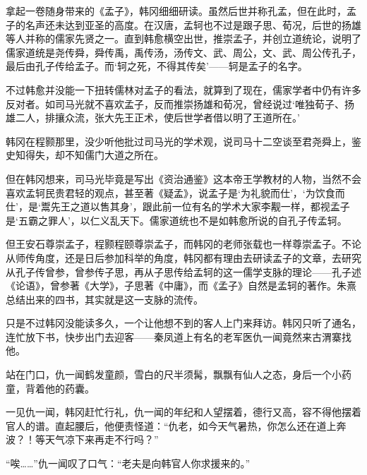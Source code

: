 拿起一卷随身带来的《孟子》，韩冈细细研读。虽然后世并称孔孟，但在此时，孟子的名声还未达到亚圣的高度。在汉唐，孟轲也不过是跟子思、荀况，后世的扬雄等人并称的儒家先贤之一。直到韩愈横空出世，推崇孟子，并创立道统论，说明了儒家道统是尧传舜，舜传禹，禹传汤，汤传文、武、周公，文、武、周公传孔子，最后由孔子传给孟子。而‘轲之死，不得其传矣’——轲是孟子的名字。

不过韩愈并没能一下扭转儒林对孟子的看法，就算到了现在，儒家学者中仍有许多反对者。如司马光就不喜欢孟子，反而推崇扬雄和荀况，曾经说过‘唯独荀子、扬雄二人，排攘众流，张大先王正术，使后世学者借以明了王道所在。’

韩冈在程颢那里，没少听他批过司马光的学术观，说司马十二空谈至君尧舜上，鉴史知得失，却不知儒门大道之所在。

但在韩冈想来，司马光毕竟是写出《资治通鉴》这本帝王学教材的人物，当然不会喜欢孟轲民贵君轻的观点，甚至著《疑孟》，说孟子是‘为礼貌而仕’，‘为饮食而仕’，是‘鬻先王之道以售其身’，跟此前一位有名的学术大家李觏一样，都视孟子是‘五霸之罪人’，以仁义乱天下。儒家道统也不是如韩愈所说的自孔子传孟轲。

但王安石尊崇孟子，程颢程颐尊崇孟子，而韩冈的老师张载也一样尊崇孟子。不论从师传角度，还是日后参加科举的角度，韩冈都有理由去研读孟子的文章，去研究从孔子传曾参，曾参传子思，再从子思传给孟轲的这一儒学支脉的理论——孔子述《论语》，曾参著《大学》，子思著《中庸》，而《孟子》自然是孟轲的著作。朱熹总结出来的四书，其实就是这一支脉的流传。

只是不过韩冈没能读多久，一个让他想不到的客人上门来拜访。韩冈只听了通名，连忙放下书，快步出门去迎客——秦凤道上有名的老军医仇一闻竟然来古渭寨找他。

站在门口，仇一闻鹤发童颜，雪白的尺半须髯，飘飘有仙人之态，身后一个小药童，背着他的药囊。

一见仇一闻，韩冈赶忙行礼，仇一闻的年纪和人望摆着，德行又高，容不得他摆着官人的谱。直起腰后，他便责怪道：“仇老，如今天气暑热，你怎么还在道上奔波？！等天气凉下来再走不行吗？”

“唉……”仇一闻叹了口气：“老夫是向韩官人你求援来的。”

